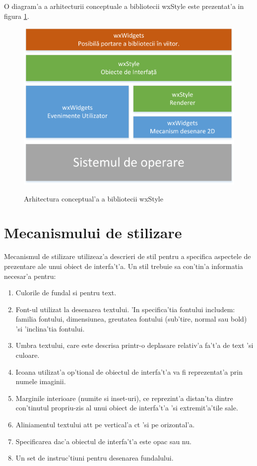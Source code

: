 O diagram'a a arhitecturii conceptuale a bibliotecii wxStyle este prezentat'a in figura \ref{ch2_arhitectura_bloc}.

\begin{center}
\begin{figure}[h]
    \centering
    \includegraphics{img/ch2_arhitectura_bloc.png}
    \label{ch2_arhitectura_bloc}
    \caption{Arhitectura conceptual'a a bibliotecii wxStyle }
\end{figure}
\end{center}

\section{Mecanismului de stilizare}

Mecanismul de stilizare utilizeaz'a descrieri de stil pentru a specifica aspectele de prezentare ale unui obiect de interfa't'a. Un stil trebuie sa con'tin'a informatia necesar'a pentru:

\begin{enumerate}
\item Culorile de fundal si pentru text.
\item Font-ul utilizat la desenarea textului. 'In specifica'tia fontului includem: familia fontului, dimensiunea, greutatea fontului (sub'tire, normal sau bold) 'si 'inclina'tia fontului.
\item Umbra textului, care este descrisa printr-o deplasare relativ'a fa't'a de text 'si culoare.
\item Icoana utilizat'a op'tional de obiectul de interfa't'a va fi reprezentat'a prin numele imaginii.
\item Marginile interioare (numite si inset-uri), ce reprezint'a distan'ta dintre con'tinutul propriu-zis al unui obiect de interfa't'a 'si extremit'a'tile sale.
\item Aliniamentul textului at{\ia}t pe vertical'a c{\ia}t 'si pe orizontal'a.
\item Specificarea dac'a obiectul de interfa't'a este opac sau nu.
\item Un set de instruc'tiuni pentru desenarea fundalului.
\end{enumerate}

